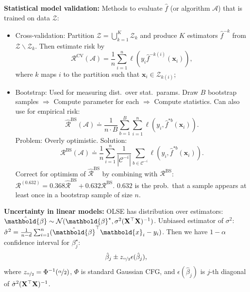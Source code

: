 \documentclass[9pt]{extarticle}
\newenvironment{topic}[1]
{\textbf{\sffamily \colorbox{black}{\rlap{\textbf{\textcolor{white}{#1}}}\hspace{\linewidth}\hspace{-2\fboxsep}}}}
{}
\newenvironment{subtopic}[1]
{\textbf{\sffamily #1:}}
{}
\renewcommand{\mat}[1]{\ensuremath{\mathbf{#1}}}
\renewcommand{\vec}[1]{\ensuremath{\mathbold{#1}}}
\begin{document}
\begin{multicols*}{3}
\begin{topic}{Gaussian processes}
    \end{topic}

    \begin{topic}{Uncertainty quantification}
        \begin{subtopic}{Statistical model validation}
            Methods to evaluate $\hat{f}$ (or algorithm $\mathcal{A}$) that is trained on data
            $\mathcal{Z}$:
            \begin{itemize}[left=0pt]
                \item Cross-validation: Partition $\mathcal{Z} = \bigcup_{k=1}^K \mathcal{Z}_k$ and produce $K$
                      estimators $\hat{f}^{-k}$ from $\mathcal{Z} \backslash \mathcal{Z}_k$. Then estimate risk by \[
                          \mathcal{R}^{\mathrm{CV}}(\mathcal{A}) = \frac{1}{n} \sum_{i=1}^{n} \ell(y_i \hat{f}^{-k(i)}(\vec{x}_i)),
                      \]
                      where $k$ maps $i$ to the partition such that $\vec{x}_i \in \mathcal{Z}_{k(i)}$;
                \item Bootstrap: Used for measuring dist.\ over stat.\ params. Draw $B$ bootstrap samples $\Rightarrow$
                      Compute parameter for each $\Rightarrow$ Compute statistics. Can also use for empirical risk: \[
                          \hat{\mathcal{R}}^{\mathrm{BS}}(\mathcal{A}) \doteq \frac{1}{n\cdot B} \sum_{b=1}^{B} \sum_{i=1}^{n} \ell(y_i, \hat{f}^{*b}(\vec{x}_i)).
                      \]
                      Problem: Overly optimistic. Solution: \[
                          \mathcal{R}^{\mathrm{BS}}(\mathcal{A}) \doteq \frac{1}{n} \sum_{i=1}^{n} \frac{1}{|\mathcal{C}^{-i}|} \sum_{b \in \mathcal{C}^{-i}} \ell(y_i, \hat{f}^{*b}(\vec{x}_i)).
                      \]
                      Correct for optimism of $\hat{\mathcal{R}}^{\mathrm{BS}}$ by combining with
                      $\mathcal{R}^{\mathrm{BS}}$: $\mathcal{R}^{(0.632)} = 0.368 \hat{\mathcal{R}}^{\mathrm{BS}} + 0.632
                          \mathcal{R}^{\mathrm{BS}}$. $0.632$ is the prob.\ that a sample appears at least once in a
                      bootstrap sample of size $n$.
            \end{itemize}

        \end{subtopic}

        \begin{subtopic}{Uncertainty in linear models}
            OLSE has distribution over estimators: $\hat{\vec{\beta}} \sim \mathcal{N}(\vec{\beta}^\star, \sigma^2 \inv{(\transpose{\mat{X}} \mat{X})})$.
            Unbiased estimator of $\sigma^2$: $\hat{\sigma}^2 = \frac{1}{n-d} \sum_{i=1}^{n}
                (\transpose{\hat{\vec{\beta}}} \vec{x}_i - y_i)$. Then we have $1-\alpha$ confidence interval for
            $\beta_j^\star$: \[
                \hat{\beta}_j \pm z_{\nicefrac{\alpha}{2}} \epsilon(\hat{\beta}_j),
            \]
            where $z_{\nicefrac{\alpha}{2}} = \Phi^{-1}(\nicefrac{\alpha}{2})$, $\Phi$ is standard Gaussian
            CFG, and $\epsilon(\hat{\beta}_j)$ is $j$-th diagonal of $\hat{\sigma}^2 \inv{(\transpose{\mat{X}}
                    \mat{X})}$.


\end{subtopic}
\end{topic}
\end{multicols*}
\end{document}
